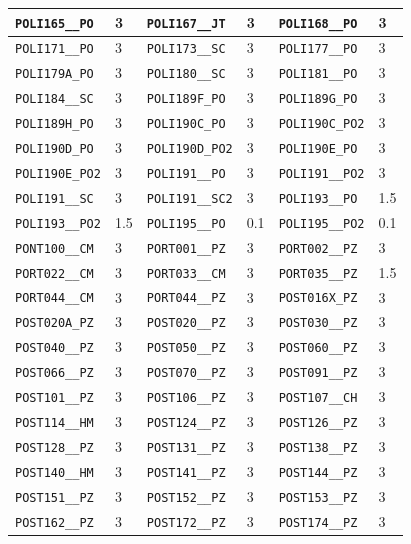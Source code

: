 \begin{longtable}{|l|l||l|l||l|l|}
    \verb|POLI165__PO| & 3 & \verb|POLI167__JT| & 3 & \verb|POLI168__PO| & 3\\\hline
    \verb|POLI171__PO| & 3 & \verb|POLI173__SC| & 3 & \verb|POLI177__PO| & 3\\\hline
    \verb|POLI179A_PO| & 3 & \verb|POLI180__SC| & 3 & \verb|POLI181__PO| & 3\\\hline
    \verb|POLI184__SC| & 3 & \verb|POLI189F_PO| & 3 & \verb|POLI189G_PO| & 3\\\hline
    \verb|POLI189H_PO| & 3 & \verb|POLI190C_PO| & 3 & \verb|POLI190C_PO2| & 3\\\hline
    \verb|POLI190D_PO| & 3 & \verb|POLI190D_PO2| & 3 & \verb|POLI190E_PO| & 3\\\hline
    \verb|POLI190E_PO2| & 3 & \verb|POLI191__PO| & 3 & \verb|POLI191__PO2| & 3\\\hline
    \verb|POLI191__SC| & 3 & \verb|POLI191__SC2| & 3 & \verb|POLI193__PO| & 1.5\\\hline
    \verb|POLI193__PO2| & 1.5 & \verb|POLI195__PO| & 0.1 & \verb|POLI195__PO2| & 0.1\\\hline
    \verb|PONT100__CM| & 3 & \verb|PORT001__PZ| & 3 & \verb|PORT002__PZ| & 3\\\hline
    \verb|PORT022__CM| & 3 & \verb|PORT033__CM| & 3 & \verb|PORT035__PZ| & 1.5\\\hline
    \verb|PORT044__CM| & 3 & \verb|PORT044__PZ| & 3 & \verb|POST016X_PZ| & 3\\\hline
    \verb|POST020A_PZ| & 3 & \verb|POST020__PZ| & 3 & \verb|POST030__PZ| & 3\\\hline
    \verb|POST040__PZ| & 3 & \verb|POST050__PZ| & 3 & \verb|POST060__PZ| & 3\\\hline
    \verb|POST066__PZ| & 3 & \verb|POST070__PZ| & 3 & \verb|POST091__PZ| & 3\\\hline
    \verb|POST101__PZ| & 3 & \verb|POST106__PZ| & 3 & \verb|POST107__CH| & 3\\\hline
    \verb|POST114__HM| & 3 & \verb|POST124__PZ| & 3 & \verb|POST126__PZ| & 3\\\hline
    \verb|POST128__PZ| & 3 & \verb|POST131__PZ| & 3 & \verb|POST138__PZ| & 3\\\hline
    \verb|POST140__HM| & 3 & \verb|POST141__PZ| & 3 & \verb|POST144__PZ| & 3\\\hline
    \verb|POST151__PZ| & 3 & \verb|POST152__PZ| & 3 & \verb|POST153__PZ| & 3\\\hline
    \verb|POST162__PZ| & 3 & \verb|POST172__PZ| & 3 & \verb|POST174__PZ| & 3\\\hline

\end{longtable}
